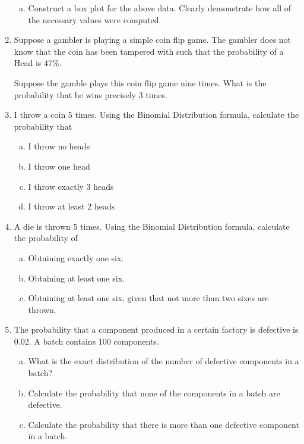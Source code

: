 \documentclass[a4paper,12pt]{article}
\begin{document}
\begin{enumerate}
\begin{enumerate}[(a)]
\item Construct a box plot for the above data. Clearly demonstrate how all of the necessary values were computed.
\end{enumerate}


\item 
Suppose a gambler is playing a simple coin flip game. 
The gambler does not know that the coin has been tampered with such that the probability of a Head is 47\%.

Suppose the gamble plays this coin flip game nine times. 
What is the probability that he wins precisely 3 times.

\item
I throw a coin 5 times.  Using the Binomial Distribution formula, calculate the probability that
\begin{multicols}{2}
\begin{enumerate}[(a)]
\item  I throw no heads
\item  I throw one head
\item  I throw exactly 3 heads
\item  I throw at least 2 heads
\end{enumerate}
\end{multicols}
\newpage
\item 
A die is thrown 5 times. Using the Binomial Distribution formula, calculate the probability of
\begin{enumerate}[(a)]
\item  Obtaining exactly one six.
\item  Obtaining at least one six.
\item  Obtaining at least one six, given that not more than two sixes are thrown.
\end{enumerate}

\item
The probability that a component produced in a certain factory is defective is 0.02. A batch contains 100
components.
\begin{enumerate}[(a)]
\item  What is the exact distribution of the number of defective components in a batch?
\item  Calculate the probability that none of the components in a batch are defective.
\item  Calculate the probability that there is more than one defective component in a batch.
\end{enumerate}


\end{enumerate}
\end{document}
